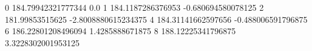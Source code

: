 0 184.79942321777344 0.0
1 184.1187286376953 -0.680694580078125
2 181.99853515625 -2.8008880615234375
4 184.31141662597656 -0.488006591796875
6 186.22801208496094 1.4285888671875
8 188.12225341796875 3.3228302001953125
